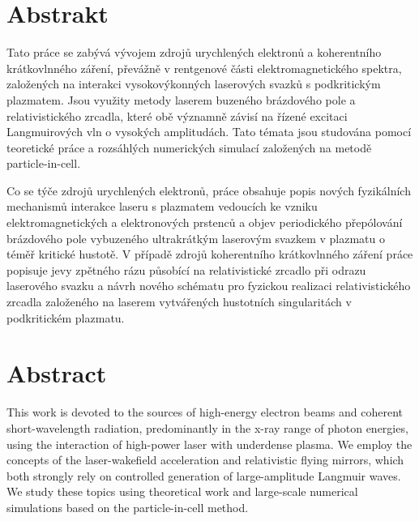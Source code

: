 \documentclass[10pt, a4paper, twoside, openright]{report}
\begin{document}




\chapter*{Abstrakt}
\thispagestyle{empty}

Tato práce se zabývá vývojem zdrojů urychlených elektronů a koherentního krátkovlnného záření, převážně v rentgenové části elektromagnetického spektra, založených na interakci vysokovýkonných laserových svazků s podkritickým plazmatem. Jsou využity metody laserem buzeného brázdového pole a relativistického zrcadla, které obě významně závisí na řízené excitaci Langmuirových vln o vysokých amplitudách. Tato témata jsou studována pomocí teoretické práce a rozsáhlých numerických simulací založených na metodě particle-in-cell.

Co se týče zdrojů urychlených elektronů, práce obsahuje popis nových fyzikálních mechanismů interakce laseru s plazmatem vedoucích ke vzniku elektromagnetických a elektronových prstenců a objev periodického přepólování brázdového pole vybuzeného ultrakrátkým laserovým svazkem v plazmatu o téměř kritické hustotě. V případě zdrojů koherentního krátkovlnného záření práce popisuje jevy zpětného rázu působící na relativistické zrcadlo při odrazu laserového svazku a návrh nového schématu pro fyzickou realizaci relativistického zrcadla založeného na laserem vytvářených hustotních singularitách v podkritickém plazmatu.

{\let\clearpage\relax\chapter*{Abstract}}
\thispagestyle{empty}

\noindent This work is devoted to the sources of high-energy electron beams and coherent short-wavelength radiation, predominantly in the x-ray range of photon energies, using the interaction of high-power laser with underdense plasma. We employ the concepts of the laser-wakefield acceleration and relativistic flying mirrors, which both strongly rely on controlled generation of large-amplitude Langmuir waves. We study these topics using theoretical work and large-scale numerical simulations based on the particle-in-cell method. 
\end{document}

